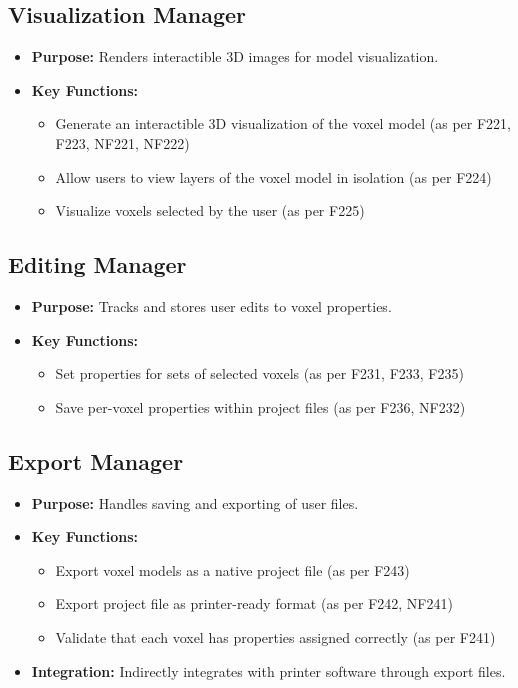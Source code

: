 \documentclass{article}
\begin{document}
\subsection{Visualization Manager}
\begin{itemize}
    \item \textbf{Purpose:} Renders interactible 3D images for model visualization.
    \item \textbf{Key Functions:} 
    \begin{itemize}
        \item Generate an interactible 3D visualization of the voxel model (as per F221, F223, NF221, NF222)
        \item Allow users to view layers of the voxel model in isolation (as per F224)
        \item Visualize voxels selected by the user (as per F225)
    \end{itemize}
\end{itemize}

\subsection{Editing Manager}
\begin{itemize}
    \item \textbf{Purpose:} Tracks and stores user edits to voxel properties.
    \item \textbf{Key Functions:} 
    \begin{itemize}
        \item Set properties for sets of selected voxels (as per F231, F233, F235)
        \item Save per-voxel properties within project files (as per F236, NF232)
    \end{itemize}
\end{itemize}

\subsection{Export Manager}
\begin{itemize}
    \item \textbf{Purpose:} Handles saving and exporting of user files.
    \item \textbf{Key Functions:} 
    \begin{itemize}
        \item Export voxel models as a native project file (as per F243)
        \item Export project file as printer-ready format (as per F242, NF241)
        \item Validate that each voxel has properties assigned correctly (as per F241)
    \end{itemize}
    \item \textbf{Integration:} Indirectly integrates with printer software through export files.
\end{itemize}
\end{document}
